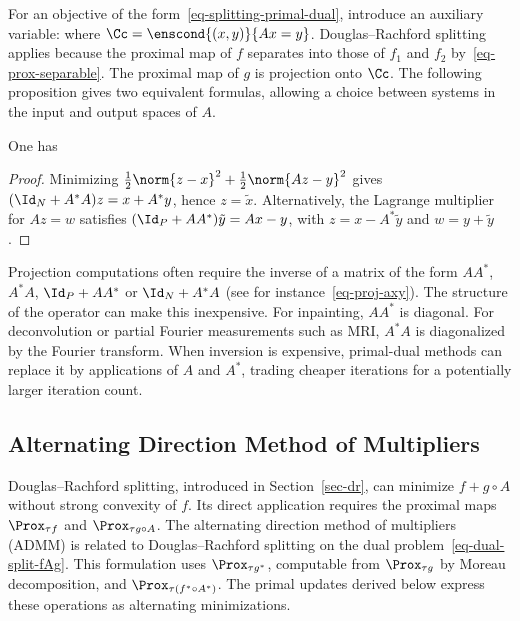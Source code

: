 For an objective of the form~\eqref{eq-splitting-primal-dual}, introduce an auxiliary variable:
where $\Cc=\enscond{(x,y)}{Ax=y}$. Douglas--Rachford splitting applies because the proximal map of $f$ separates into those of $f_1$ and $f_2$ by~\eqref{eq-prox-separable}. The proximal map of $g$ is projection onto $\Cc$. The following proposition gives two equivalent formulas, allowing a choice between systems in the input and output spaces of $A$.

\begin{prop}One has
\end{prop}
\begin{proof}
Minimizing $\frac12\norm{z-x}^2+\frac12\norm{Az-y}^2$ gives $(\Id_N+A^*A)z=x+A^*y$, hence $z=\tilde x$. Alternatively, the Lagrange multiplier for $Az=w$ satisfies $(\Id_P+AA^*)\tilde y=Ax-y$, with $z=x-A^*\tilde y$ and $w=y+\tilde y$.
\end{proof}

\begin{rem}\label{rem-inv-lin}
	Projection computations often require the inverse of a matrix of the form
	$AA^*$, $A^*A$, $\Id_P+AA^*$ or $\Id_N+A^*A$ (see for instance~\eqref{eq-proj-axy}).
	The structure of the operator can make this inexpensive.
	For inpainting, $AA^*$ is diagonal. For deconvolution or partial Fourier measurements such as MRI, $A^*A$ is diagonalized by the Fourier transform.
	When inversion is expensive, primal-dual methods can replace it by applications of $A$ and $A^*$, trading cheaper iterations for a potentially larger iteration count.
\end{rem}


\subsection{Alternating Direction Method of Multipliers}

Douglas--Rachford splitting, introduced in Section~\ref{sec-dr}, can minimize $f+g\circ A$ without strong convexity of $f$. Its direct application requires the proximal maps $\Prox_{\tau f}$ and $\Prox_{\tau g\circ A}$.
%
The alternating direction method of multipliers (ADMM) is related to Douglas--Rachford splitting on the dual problem~\eqref{eq-dual-split-fAg}. This formulation uses $\Prox_{\tau g^*}$, computable from $\Prox_{\tau g}$ by Moreau decomposition, and $\Prox_{\tau(f^*\circ A^*)}$. The primal updates derived below express these operations as alternating minimizations.

